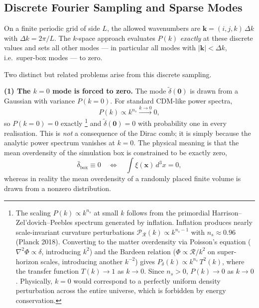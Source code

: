 \documentclass[12pt]{article}
\begin{document}
\subsection{Discrete Fourier Sampling and Sparse Modes}

On a finite periodic grid of side $L$, the allowed wavenumbers are
$\mathbf{k} = (i,j,k)\,\Delta k$ with $\Delta k = 2\pi/L$.  The $k$-space
approach evaluates $P(k)$ \emph{exactly} at these discrete values and
sets all other modes --- in particular all modes with
$|\mathbf{k}| < \Delta k$, i.e.\ super-box modes --- to zero.

Two distinct but related problems arise from this discrete sampling.

\textbf{(1) The $k=0$ mode is forced to zero.}
The mode $\tilde{\delta}(\mathbf{0})$ is drawn from a Gaussian with
variance $P(k=0)$.  For standard CDM-like power spectra,
\begin{equation}
  P(k) \propto k^{n_s} \xrightarrow{k \to 0} 0,
\end{equation}
so $P(k=0) = 0$ exactly%
\footnote{The scaling $P(k) \propto k^{n_s}$ at small $k$ follows from
  the primordial Harrison--Zel'dovich--Peebles spectrum generated by
  inflation.  Inflation produces nearly scale-invariant curvature
  perturbations $\mathcal{P}_\mathcal{R}(k) \propto k^{n_s-1}$ with
  $n_s \approx 0.96$ (Planck 2018).  Converting to the matter
  overdensity via Poisson's equation ($\nabla^2\Phi \propto \delta$,
  introducing $k^2$) and the Bardeen relation ($\Phi \propto
  \mathcal{R}/k^2$ on super-horizon scales, introducing another
  $k^{-2}$) gives $P_\delta(k) \propto k^{n_s}\,T^2(k)$, where the
  transfer function $T(k) \to 1$ as $k \to 0$.  Since $n_s > 0$,
  $P(k) \to 0$ as $k \to 0$.  Physically, $k = 0$ would correspond to
  a perfectly uniform density perturbation across the entire universe,
  which is forbidden by energy conservation.} and $\tilde{\delta}(\mathbf{0}) = 0$ with
probability one in every realisation.  This is \emph{not} a consequence
of the Dirac comb; it is simply because the analytic power spectrum
vanishes at $k=0$.  The physical meaning is that the mean overdensity
of the simulation box is constrained to be exactly zero,
\begin{equation}
  \bar{\delta}_\mathrm{box} \equiv 0
  \quad \Longleftrightarrow \quad
  \int \xi(\mathbf{x})\,d^3x = 0,
  \label{eq:zeromean}
\end{equation}
whereas in reality the mean overdensity of a randomly placed finite
volume is drawn from a nonzero distribution.
\end{document}
